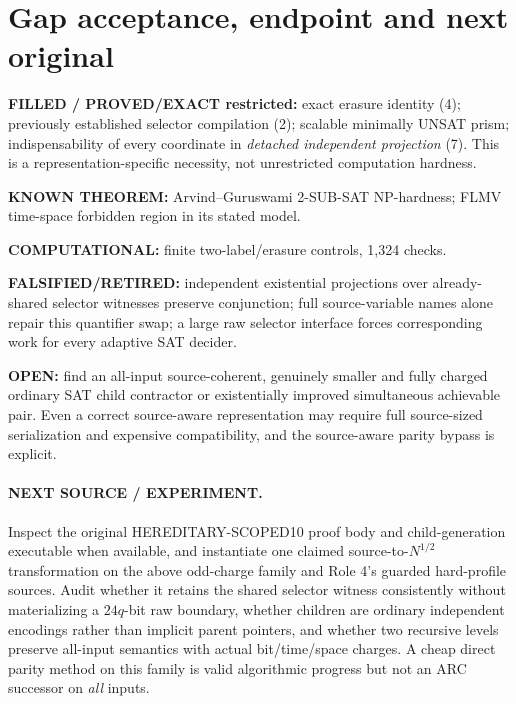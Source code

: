 \documentclass[11pt]{article}
\begin{document}
\section{Gap acceptance, endpoint and next original}
\noindent\textbf{FILLED / PROVED/EXACT restricted:} exact erasure identity (4); previously established selector compilation (2); scalable minimally UNSAT prism; indispensability of every coordinate in \emph{detached independent projection} (7). This is a representation-specific necessity, not unrestricted computation hardness.
\par\noindent\textbf{KNOWN THEOREM:} Arvind--Guruswami 2-SUB-SAT NP-hardness; FLMV time-space forbidden region in its stated model.
\par\noindent\textbf{COMPUTATIONAL:} finite two-label/erasure controls, 1,324 checks.
\par\noindent\textbf{FALSIFIED/RETIRED:} independent existential projections over already-shared selector witnesses preserve conjunction; full source-variable names alone repair this quantifier swap; a large raw selector interface forces corresponding work for every adaptive SAT decider.
\par\noindent\textbf{OPEN:} find an all-input source-coherent, genuinely smaller and fully charged ordinary SAT child contractor or existentially improved simultaneous achievable pair. Even a correct source-aware representation may require full source-sized serialization and expensive compatibility, and the source-aware parity bypass is explicit.

\paragraph{NEXT SOURCE / EXPERIMENT.}
Inspect the original HEREDITARY-SCOPED10 proof body and child-generation executable when available, and instantiate one claimed source-to-$N^{1/2}$ transformation on the above odd-charge family and Role 4's guarded hard-profile sources. Audit whether it retains the shared selector witness consistently without materializing a $24q$-bit raw boundary, whether children are ordinary independent encodings rather than implicit parent pointers, and whether two recursive levels preserve all-input semantics with actual bit/time/space charges. A cheap direct parity method on this family is valid algorithmic progress but not an ARC successor on \emph{all} inputs.
\end{document}
